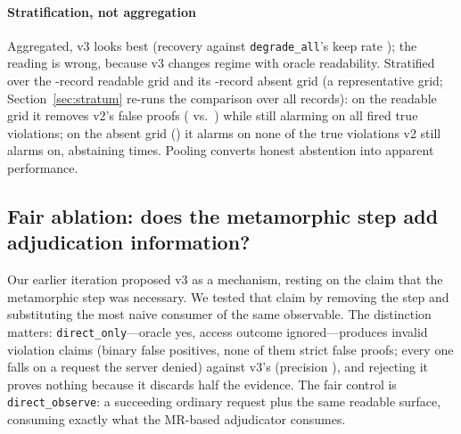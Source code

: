 \paragraph{Stratification, not aggregation}
Aggregated, v3 looks best (recovery \ResVdVThreeRecoveryRate{} against
\texttt{degrade\_all}'s keep rate \ResVdDegradeallKeepRate{}); the reading is wrong,
because v3 changes regime with oracle readability. Stratified over the
\ResIntroOnN{}-record readable grid and its \ResIntroOffN{}-record absent grid (a
representative grid; Section~\ref{sec:stratum} re-runs the comparison over all
\ResSynRecords{} records): on the readable grid it removes v2's false proofs
(\ResIntroOnVthreeFpN{} vs.~\ResIntroOnVtwoFpN{}) while still alarming on all
\ResIntroOnVthreeProvenBola{} fired true violations; on the absent grid
(\ResIntroOffN{}) it alarms on none of the \ResIntroOffVtwoProvenBola{} true
violations v2 still alarms on, abstaining \ResIntroOffAbstain{} times. Pooling
converts honest abstention into apparent performance.

\subsection{Fair ablation: does the metamorphic step add adjudication information?}
\label{sec:synthetic-ablation}

Our earlier iteration proposed v3 as a mechanism, resting on the claim that the
metamorphic step was necessary. We tested that claim by removing the step and
substituting the most naive consumer of the same observable. The distinction
matters: \texttt{direct\_only}---oracle yes, access outcome ignored---produces
\ResAbDirectOnlyFP{} invalid violation claims (binary false positives, none of them
strict false proofs; every one falls on a request the server denied) against v3's
\ResAbVThreeFP{} (precision \ResAbDirectOnlyPrec{}), and rejecting it proves nothing
because it discards half the evidence. The fair control is \texttt{direct\_observe}:
a succeeding ordinary request plus the same readable surface, consuming exactly what
the MR-based adjudicator consumes.

